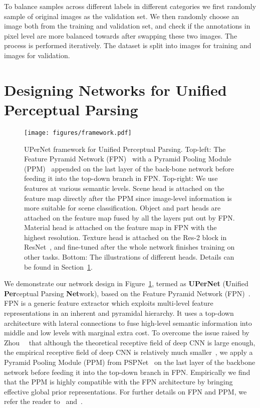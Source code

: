\documentclass[runningheads]{llncs}
\begin{document}
To balance samples across different labels in different categories we first randomly sample  of original images as the validation set. We then randomly choose an image both from the training and validation set, and check if the annotations in pixel level are more balanced towards  after swapping these two images. The process is performed iteratively. The dataset is split into  images for training and  images for validation.

\section{Designing Networks for Unified Perceptual Parsing}
\label{sec:framework}

\begin{figure}[!t]
\centering
\texttt{[image: figures/framework.pdf]}
\caption{UPerNet framework for Unified Perceptual Parsing. Top-left: The Feature Pyramid Network (FPN)~\cite{lin2017feature} with a Pyramid Pooling Module (PPM)~\cite{zhao2017pyramid} appended on the last layer of the back-bone network before feeding it into the top-down branch in FPN. Top-right: We use features at various semantic levels. Scene head is attached on the feature map directly after the PPM since image-level information is more suitable for scene classification. Object and part heads are attached on the feature map fused by all the layers put out by FPN. Material head is attached on the feature map in FPN with the highest resolution. Texture head is attached on the Res-2 block in ResNet~\cite{he2016deep}, and fine-tuned after the whole network finishes training on other tasks. Bottom: The illustrations of different heads. Details can be found in Section~\ref{sec:framework}.}
\label{fig:framework}
\end{figure}

We demonstrate our network design in Figure~\ref{fig:framework}, termed as \textbf{UPerNet} (\textbf{U}nified \textbf{Per}ceptual Parsing \textbf{Net}work), based on the Feature Pyramid Network (FPN)~\cite{lin2017feature}. FPN is a generic feature extractor which exploits multi-level feature representations in an inherent and pyramidal hierarchy. It uses a top-down architecture with lateral connections to fuse high-level semantic information into middle and low levels with marginal extra cost. To overcome the issue raised by Zhou~\etal~ \cite{zhou2014object} that although the theoretical receptive field of deep CNN is large enough, the empirical receptive field of deep CNN is relatively much smaller~\cite{zhou2016learning}, we apply a Pyramid Pooling Module (PPM) from PSPNet~\cite{zhao2017pyramid} on the last layer of the backbone network before feeding it into the top-down branch in FPN. Empirically we find that the PPM is highly compatible with the FPN architecture by bringing effective global prior representations. For further details on FPN and PPM, we refer the reader to~\cite{lin2017feature} and~\cite{zhao2017pyramid}.
\end{document}
